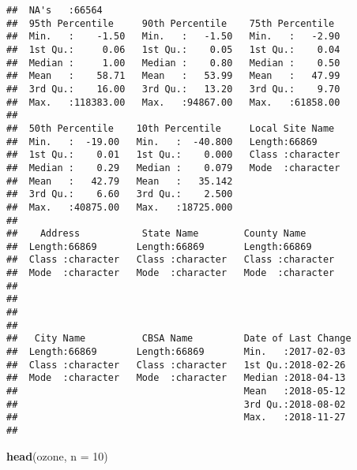 \documentclass[]{article}
\newenvironment{Shaded}{\begin{snugshade}}{\end{snugshade}}
\newcommand{\KeywordTok}[1]{\textcolor[rgb]{0.13,0.29,0.53}{\textbf{#1}}}
\newcommand{\DataTypeTok}[1]{\textcolor[rgb]{0.13,0.29,0.53}{#1}}
\newcommand{\DecValTok}[1]{\textcolor[rgb]{0.00,0.00,0.81}{#1}}
\newcommand{\NormalTok}[1]{#1}
\begin{document}
\begin{verbatim}
##  NA's   :66564                                                        
##  95th Percentile     90th Percentile    75th Percentile   
##  Min.   :    -1.50   Min.   :   -1.50   Min.   :   -2.90  
##  1st Qu.:     0.06   1st Qu.:    0.05   1st Qu.:    0.04  
##  Median :     1.00   Median :    0.80   Median :    0.50  
##  Mean   :    58.71   Mean   :   53.99   Mean   :   47.99  
##  3rd Qu.:    16.00   3rd Qu.:   13.20   3rd Qu.:    9.70  
##  Max.   :118383.00   Max.   :94867.00   Max.   :61858.00  
##                                                           
##  50th Percentile    10th Percentile     Local Site Name   
##  Min.   :  -19.00   Min.   :  -40.800   Length:66869      
##  1st Qu.:    0.01   1st Qu.:    0.000   Class :character  
##  Median :    0.29   Median :    0.079   Mode  :character  
##  Mean   :   42.79   Mean   :   35.142                     
##  3rd Qu.:    6.60   3rd Qu.:    2.500                     
##  Max.   :40875.00   Max.   :18725.000                     
##                                                           
##    Address           State Name        County Name       
##  Length:66869       Length:66869       Length:66869      
##  Class :character   Class :character   Class :character  
##  Mode  :character   Mode  :character   Mode  :character  
##                                                          
##                                                          
##                                                          
##                                                          
##   City Name          CBSA Name         Date of Last Change 
##  Length:66869       Length:66869       Min.   :2017-02-03  
##  Class :character   Class :character   1st Qu.:2018-02-26  
##  Mode  :character   Mode  :character   Median :2018-04-13  
##                                        Mean   :2018-05-12  
##                                        3rd Qu.:2018-08-02  
##                                        Max.   :2018-11-27  
## 
\end{verbatim}

\begin{Shaded}
\begin{Highlighting}[]
\KeywordTok{head}\NormalTok{(ozone, }\DataTypeTok{n =} \DecValTok{10}\NormalTok{)}
\end{Highlighting}
\end{Shaded}
\end{document}

